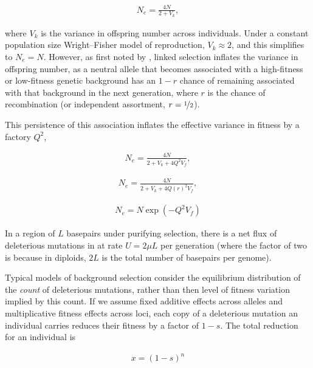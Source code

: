 \documentclass[11pt]{article}
\begin{document}
\begin{align}
  N_e = \frac{4N}{2 + V_k},
\end{align}

where $V_k$ is the variance in offspring number across individuals. Under a
constant population size Wright--Fisher model of reproduction, $V_k \approx 2$,
and this simplifies to $N_e = N$. However, as first noted by
\textcite{Robertson1961-ho}, linked selection inflates the variance in
offspring number, as a neutral allele that becomes associated with a
high-fitness or low-fitness genetic background has an $1-r$ chance of remaining
associated with that background in the next generation, where $r$ is the chance
of recombination (or independent assortment, $r=\nicefrac{1}{2}$). 


This persistence of this association inflates the effective variance in fitness
by a factory $Q^2$, 

\begin{align}
  N_e = \frac{4N}{2 + V_k + 4 Q^2 V_f},
\end{align}


\begin{align}
  N_e = \frac{4N}{2 + V_k + 4 Q(r)^2 V_f},
\end{align}




\begin{align}
  N_e = N \exp\left(-Q^2 V_f\right)
\end{align}

In a region of $L$ basepairs under purifying selection, there is a net flux of
deleterious mutations in at rate $U = 2 \mu L$ per generation (where the factor
of two is because in diploids, $2L$ is the total number of basepairs per genome). 

Typical models of background selection consider the equilibrium distribution of
the \emph{count} of deleterious mutations, rather than then level of fitness
variation implied by this count. If we assume fixed additive effects across
alleles and multiplicative fitness effects across loci, each copy of a
deleterious mutation an individual carries reduces their fitness by a factor of
$1-s$. The total reduction for an individual is

\begin{align}
  x = (1-s)^n
\end{align}
\end{document}
